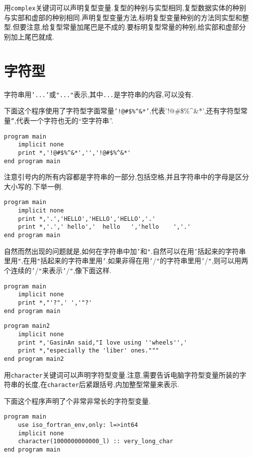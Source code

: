 用\texttt{complex}关键词可以声明复型变量.复型的种别与实型相同,复型数据实体的种别与实部和虚部的种别相同.声明复型变量方法,标明复型变量种别的方法同实型和整型.但要注意,给复型常量加尾巴是不成的.要标明复型常量的种别,给实部和虚部分别加上尾巴就成.

\section{字符型}\label{fortran_char}

字符串用\texttt{'...'}或\texttt{"..."}表示,其中\texttt{...}是字符串的内容,可以没有.

下面这个程序使用了字符型字面常量\texttt{'!@\#{}\${}\%{}\^{}\&{}*'},代表'!@\#{}\${}\%{}\^{}\&{}*',还有字符型常量\texttt{''},代表一个字符也无的``空字符串''.
\begin{lstlisting}
program main
    implicit none
    print *,'!@#$%^&*','','!@#$%^&*'
end program main
\end{lstlisting}

注意引号内的所有内容都是字符串的一部分,包括空格,并且字符串中的字母是区分大小写的.下举一例.
\begin{lstlisting}
program main
    implicit none
    print *,'.','HELLO','HELLO','HELLO','.'
    print *,'.',' hello','  hello   ','hello    ','.'
end program main
\end{lstlisting}

自然而然出现的问题就是,如何在字符串中加\texttt{'}和\texttt{"}.自然可以在用\texttt{'}括起来的字符串里用\texttt{"},在用\texttt{"}括起来的字符串里用\texttt{'}.如果非得在用\texttt{'}/\texttt{"}的字符串里用\texttt{'}/\texttt{"},则可以用两个连续的\texttt{'}/\texttt{"}来表示\texttt{'}/\texttt{"},像下面这样.
\begin{lstlisting}
program main
    implicit none
    print *,"'?",' ','"?'
end program main
\end{lstlisting}
\begin{lstlisting}
program main2
    implicit none
    print *,'GasinAn said,"I love using ''wheels'','
    print *,"especially the 'liber' ones."""
end program main2
\end{lstlisting}

用\texttt{character}关键词可以声明字符型变量.注意,需要告诉电脑字符型变量所装的字符串的长度,在\texttt{character}后紧跟括号,内加整型常量来表示.

下面这个程序声明了个非常非常长的字符型变量.
\begin{lstlisting}
program main
    use iso_fortran_env,only: l=>int64
    implicit none
    character(1000000000000_l) :: very_long_char
end program main
\end{lstlisting}

